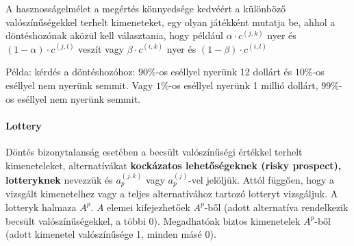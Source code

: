 \documentclass[a4paper,12pt]{article}
\begin{document}


A hasznosságelmélet a megértés könnyedsége kedvéért a különböző valószínűségekkel terhelt kimeneteket, egy olyan játékként mutatja be, ahhol a döntéshozónak aközül kell választania, hogy például $\alpha \cdot c^{(j,k)}$ nyer és $(1-\alpha) \cdot c^{(j,l)}$ veszít vagy $\beta \cdot c^{(i,k)}$ nyer és $(1-\beta) \cdot c^{(i,l)}$

Példa: kérdés a döntéshozóhoz: $90\%$-os eséllyel nyerünk 12 dollárt és $10\%$-os eséllyel nem nyerünk semmit. Vagy $1\%$-os eséllyel nyerünk 1 millió dollárt, $99\%$-os eséllyel nem nyerünk semmit.

\paragraph{Lottery} Döntés bizonytalanság esetében a becsült valószínűségi értékkel terhelt kimeneteleket, alternatívákat \textbf{kockázatos lehetőségeknek (risky prospect), lotteryknek} nevezzük és $a^{(j,k)}_p$ vagy $a^{(j)}_p$-vel jelöljük. Attól függően, hogy a vizsgált kimenetelhez vagy a teljes alternatívához tartozó lotteryt vizsgáljuk.  A lotteryk halmaza $A^p$.  $A$ elemei kifejezhetőek $A^p$-ből (adott alternatíva rendelkezik becsült valószínűségekkel, a többi 0). Megadhatóak biztos kimenetelek $A^p$-ből (adott kimenetel valószínűsége 1, minden másé 0).
\end{document}

